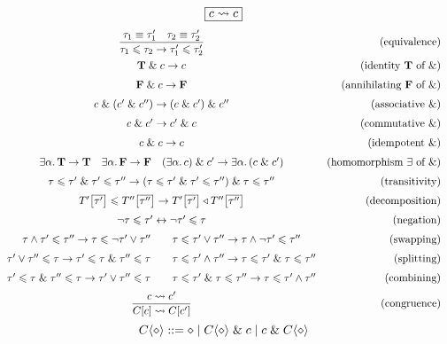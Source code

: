 $$ \boxed{c \leadsto c} $$
$$ \renewcommand\arraystretch{1.5} \begin{array}{cr}
\dfrac{\tau_1 \equiv \tau_1' \quad \tau_2 \equiv \tau_2'}{\tau_1 \sub \tau_2 \to \tau_1' \sub \tau_2'} 
& \text{(equivalence)}
\\[4pt]
\tru \und c \to c 
& \text{(identity $\tru$ of $\undsym$)}
\\
\fals \und c \to \fals
& \text{(annihilating $\fals$ of $\undsym$)}
\\
c \und (c' \und c'') \to (c \und c') \und c'' 
& \text{(associative $\undsym$)}
\\
c \und c' \to c' \und c
& \text{(commutative $\undsym$)}
\\
c \und c \to c
& \text{(idempotent $\undsym$)}
\\
\exists \alpha \ldotp \tru \to \tru 
\quad
\exists \alpha \ldotp \fals \to \fals
\quad
(\exists \alpha \ldotp c) \und c' \to \exists \alpha \ldotp (c \und c')
& \text{(homomorphism $\exists$ of $\undsym$)}
\\
\tau \sub \tau' \und \tau' \sub \tau'' \to (\tau \sub \tau' \und \tau' \sub \tau'') \und \tau \sub \tau'' 
& \text{(transitivity)}
\\
T'\left[\overline {\tau'}\right] \sub T''\left[\overline {\tau''}\right] 
\to T'\left[\overline {\tau'}\right] \triangleleft T''\left[\overline {\tau''}\right]
& \text{(decomposition)}
\\
\comp \tau \sub \tau' \leftrightarrow \comp \tau' \sub \tau 
& \text{(negation)}
\\
\tau \meet \tau' \sub \tau'' \to \tau \sub \comp \tau' \join \tau''
\qquad
\tau \sub \tau' \join \tau'' \to \tau \meet \comp \tau' \sub \tau''
& \text{(swapping)}
\\
\tau' \join \tau'' \sub \tau \to \tau' \sub \tau \und \tau'' \sub \tau
\qquad
\tau \sub \tau' \meet \tau'' \to \tau \sub \tau' \und \tau \sub \tau''
& \text{(splitting)} 
\\
\tau' \sub \tau \und \tau'' \sub \tau \to \tau' \join \tau'' \sub \tau
\qquad
\tau \sub \tau' \und \tau \sub \tau'' \to \tau \sub \tau' \meet \tau''
& \text{(combining)} 
\\[4pt]
\dfrac{c \step c'}{C[c] \step C[c']}
& \text{(congruence)} 
\\
\end{array} $$
$$ \solvectx ::= \ctxhole \mid \solvectx \und c \mid c \und \solvectx $$
